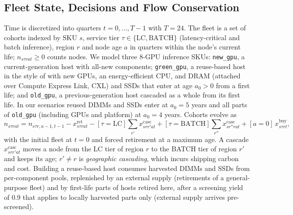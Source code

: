 \documentclass[11pt]{article}
\begin{document}
\subsection{Fleet State, Decisions and Flow Conservation}
Time is discretized into quarters $t=0,\dots,T-1$ with $T=24$. The fleet is a set of cohorts indexed by SKU $s$, service tier $\tau\in\{\text{LC},\text{BATCH}\}$ (latency-critical and batch inference), region $r$ and node age $a$ in quarters within the node's current life; $n_{s\tau rat}\ge 0$ counts nodes. We model three 8-GPU inference SKUs: \texttt{new\_gpu}, a current-generation host with all-new components; \texttt{green\_gpu}, a reuse-based host in the style of \citet{wang2024greensku} with new GPUs, an energy-efficient CPU, and DRAM (attached over Compute Express Link, CXL) and SSDs that enter at age $a_0>0$ from a first life; and \texttt{old\_gpu}, a previous-generation host cascaded as a whole from its first life. In our scenarios reused DIMMs and SSDs enter at $a_0=5$ years and all parts of \texttt{old\_gpu} (including GPUs and platform) at $a_0=4$ years. Cohorts evolve as
\begin{equation}
n_{s\tau rat} = n_{s\tau r,a-1,t-1} - x^{\text{ret}}_{s\tau rat} - [\tau{=}\text{LC}]\sum_{r'} x^{\text{casc}}_{srr'at} + [\tau{=}\text{BATCH}]\sum_{r''} x^{\text{casc}}_{sr''rat} + [a{=}0]\,x^{\text{buy}}_{s\tau rt},
\label{eq:flow}
\end{equation}
with the initial fleet at $t=0$ and forced retirement at a maximum age. A cascade $x^{\text{casc}}_{srr'at}$ moves a node from the LC tier of region $r$ to the BATCH tier of region $r'$ and keeps its age; $r'\neq r$ is \emph{geographic cascading}, which incurs shipping carbon and cost. Building a reuse-based host consumes harvested DIMMs and SSDs from per-component pools, replenished by an external supply (retirements of a general-purpose fleet) and by first-life parts of hosts retired here, after a screening yield of 0.9 that applies to locally harvested parts only (external supply arrives pre-screened).
\end{document}

